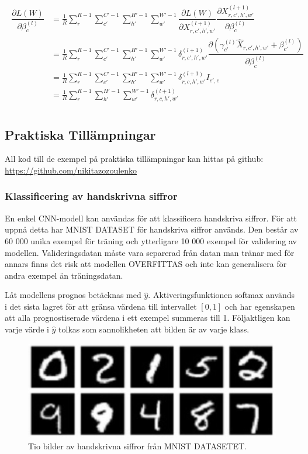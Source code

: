 \documentclass[a4paper,11pt,twoside]{article}
\newcommand*{\pd}[2]{\ensuremath{\dfrac{\partial #1}{\partial #2}}}
\begin{document}
\begin{align}
\begin{split}
	\pd{L(W)}{\beta^{(l)}_{c}}
		& = \frac{1}{R}\sum^{R-1}_{r} \sum^{C'-1}_{c'} \sum^{H'-1}_{h'} \sum^{W'-1}_{w'} \pd{L(W)}{X^{(l+1)}_{r,c',h',w'}} \pd{X^{(l+1)}_{r,c',h',w'}}{\beta^{(l)}_{c}} \\
		& = \frac{1}{R}\sum^{R-1}_{r} \sum^{C'-1}_{c'} \sum^{H'-1}_{h'} \sum^{W'-1}_{w'} \delta^{(l+1)}_{r,c',h',w'}  \pd{({\gamma_{c'}^{(l)} \hat{X}_{r,c',h',w'} + \beta_{c'}^{(l)}})}{\beta^{(l)}_{c}} \\
		& = \frac{1}{R}\sum^{R-1}_{r} \sum^{C'-1}_{c'} \sum^{H'-1}_{h'} \sum^{W'-1}_{w'} \delta^{(l+1)}_{r,c,h',w'} I_{c',c}\\
		& = \frac{1}{R}\sum^{R-1}_{r} \sum^{H'-1}_{h'} \sum^{W'-1}_{w'} \delta^{(l+1)}_{r,c,h',w'} \\
\end{split}
\end{align}

\subsection{Praktiska Tillämpningar}
All kod till de exempel på praktiska tillämpningar kan hittas på github: \url{https://github.com/nikitazozoulenko}
\subsubsection{Klassificering av handskrivna siffror}
En enkel CNN-modell kan användas för att klassificera handskriva siffror. För att uppnå detta har MNIST DATASET för handskriva siffror används. Den består av 60 000 unika exempel för träning och ytterligare 10 000 exempel för validering av modellen. Valideringsdatan måste vara separerad från datan man tränar med för annars finns det risk att modellen OVERFITTAS och inte kan generalisera för andra exempel än träningsdatan. \cite{MNIST}

Låt modellens prognos betäcknas med $\hat{y}$. Aktiveringsfunktionen softmax används i det sista lagret för att gränsa värdena till intervallet $[0,1]$ och har egenskapen att alla prognostiserade värdena i ett exempel summeras till 1. Följaktligen kan varje värde i $\hat{y}$ tolkas som sannolikheten att bilden är av varje klass. \cite{cs231n}

\begin{figure}[h]\label{figMNIST}
	\centering
  		\includegraphics[scale=1]{mnist.png}
  	\caption{Tio bilder av handskrivna siffror från MNIST DATASETET. \cite{MNIST}}
\end{figure}
\end{document}

